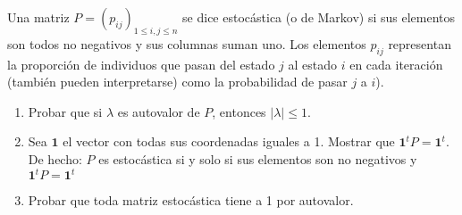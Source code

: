 \begin{enunciado}{\ejercicio}
  Una matriz $P = (p_{ij})_{1\leq i, j \leq n}$ se dice estocástica (o de Markov) si sus elementos
  son todos no negativos y sus columnas suman uno. Los elementos $p_{ij}$ representan la proporción
  de individuos que pasan del estado $j$ al estado $i$ en cada iteración (también pueden interpretarse)
  como la probabilidad de pasar $j$ a $i$).

  \begin{enumerate}[label=(\alph*)]
    \item Probar que si $\lambda$ es autovalor de $P$, entonces $|\lambda| \leq 1$.
    \item Sea $\bm{1}$ el vector con todas sus coordenadas iguales a 1. Mostrar que $\bm{1}^t P = \bm{1}^t$.
          De hecho: $P$ es estocástica si y solo si sus elementos son no negativos y $\bm{1}^t P = \bm{1}^t$
    \item Probar que toda matriz estocástica tiene a 1 por autovalor.
  \end{enumerate}
\end{enunciado}

